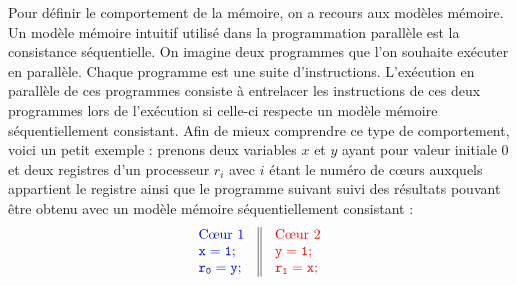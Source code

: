 \documentclass[12pt,a4paper]{article}
\begin{document}
Pour définir le comportement de la mémoire, on a recours aux modèles mémoire. Un modèle mémoire intuitif utilisé dans la programmation parallèle est la consistance séquentielle. On imagine deux programmes que l'on souhaite exécuter en parallèle. Chaque programme est une suite d'instructions. L'exécution en parallèle de ces programmes consiste à entrelacer les instructions de ces deux programmes lors de l'exécution si celle-ci respecte un modèle mémoire séquentiellement consistant. Afin de mieux comprendre ce type de comportement, voici un petit exemple : prenons deux variables $x$ et $y$ ayant pour valeur initiale 0 et deux registres d'un processeur $r_i$ avec $i$ étant le numéro de cœurs auxquels appartient le registre ainsi que le programme suivant suivi des résultats pouvant être obtenu avec un modèle mémoire séquentiellement consistant :
\clearpage
\[
\begin{array}{c||c}
  \begin{array}{l}
    \textcolor[rgb]{0,0,1}{\text{C\oe{}ur 1}} \\
    \textcolor[rgb]{0,0,1}{\mathtt{x = 1;}} \\
    \textcolor[rgb]{0,0,1}{\mathtt{r_0 = y;}} \\
  \end{array} &
  \begin{array}{l}
    \textcolor[rgb]{1,0,0}{\text{C\oe{}ur 2}} \\
    \textcolor[rgb]{1,0,0}{\mathtt{y = 1;}} \\
    \textcolor[rgb]{1,0,0}{\mathtt{r_1 = x;}} \\
  \end{array}
\end{array}
\]
\end{document}
